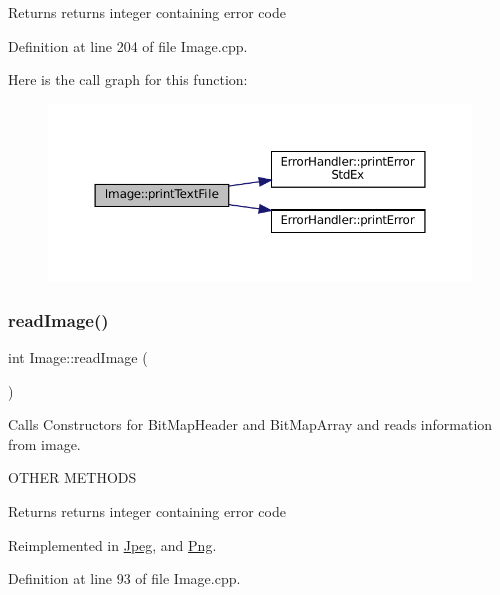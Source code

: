 \begin{DoxyReturn}{Returns}
returns integer containing error code 
\end{DoxyReturn}


Definition at line 204 of file Image.\+cpp.

Here is the call graph for this function\+:\nopagebreak
\begin{figure}[H]
\begin{center}
\leavevmode
\includegraphics[width=350pt]{classImage_ae5daf791502caefeae1b15360d354513_cgraph}
\end{center}
\end{figure}
\mbox{\label{classImage_ac0aa1f41cb368d87b20dd38839218d93}} 
\subsubsection{\texorpdfstring{readImage()}{readImage()}}
{\footnotesize\ttfamily int Image\+::read\+Image (\begin{DoxyParamCaption}{ }\end{DoxyParamCaption})\hspace{0.3cm}{\ttfamily [virtual]}}



Calls Constructors for Bit\+Map\+Header and Bit\+Map\+Array and reads information from image. 

O\+T\+H\+ER M\+E\+T\+H\+O\+DS\begin{DoxyReturn}{Returns}
returns integer containing error code 
\end{DoxyReturn}


Reimplemented in \mbox{\hyperlink{classJpeg_a80db9e22efc544e32145b6743b2b407c}{Jpeg}}, and \mbox{\hyperlink{classPng_aa38d2a6baa44bd0b3a932b93ee67e419}{Png}}.



Definition at line 93 of file Image.\+cpp.

